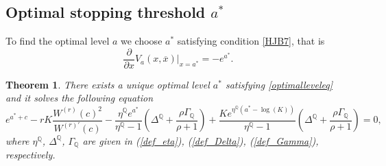 \documentclass[10pt]{amsart}
\def\Q{{\mathbb{Q}}}
\newtheorem{Thm}{Theorem}
\begin{document}
		\subsection{Optimal stopping threshold $a^*$}
		To find the optimal level $a$ we choose $a^*$ satisfying condition \eqref{HJB7}, that is 
		\begin{equation}\label{optimalleveleq}\frac{\partial}{\partial x} V_a(x, \overline{x})\big|_{x = a^*}=-e^{a^*}.\end{equation}
		\begin{Thm}
			There exists a unique optimal level $a^*$ satisfying \eqref{optimalleveleq} and it solves the following equation
			\begin{equation}\label{otimala*}
				e^{a^*+c} - rK \frac{W^{(r)}(c)^2}{W^{(r)'}(c)} -  \frac{\eta^\Q e^{a^*}}{\eta^\Q-1}\left( \Delta^\Q + \frac{\rho\Gamma_\Q}{\rho+1} \right)  + \frac{Ke^{\eta^\Q(a^*-\log(K))}}{\eta^\Q-1}\left( \Delta^\Q + \frac{\rho\Gamma_\Q}{\rho+1} \right)
				=0,
			\end{equation}
			where $\eta^\Q$, $\Delta^\Q$, $\Gamma_\Q$ are given in (\ref{def_eta}), (\ref{def_Delta}), (\ref{def_Gamma}), respectively.
		\end{Thm}
\end{document}
